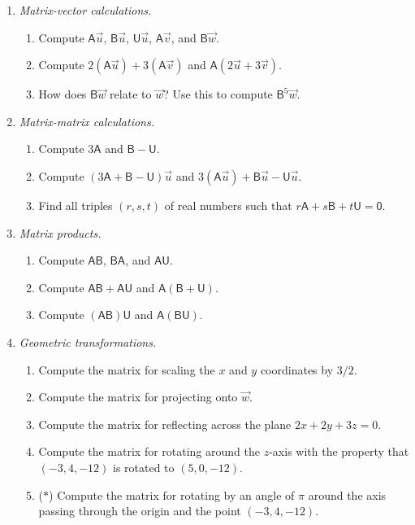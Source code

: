 \begin{enumerate}
\item \emph{Matrix-vector calculations.}
\begin{enumerate}
\item Compute $\mathsf{A}\vec{u}$, $\mathsf{B}\vec{u}$, $\mathsf{U}\vec{u}$, $\mathsf{A}\vec{v}$, and $\mathsf{B}\vec{w}$.
\item Compute $2(\mathsf{A}\vec{u}) + 3(\mathsf{A}\vec{v})$ and $\mathsf{A}(2\vec{u} + 3\vec{v})$.
\item How does $\mathsf{B}\vec{w}$ relate to $\vec{w}$? Use this to compute $\mathsf{B}^5\vec{w}$.
\end{enumerate}
\item \emph{Matrix-matrix calculations.}
\begin{enumerate}
\item Compute $3\mathsf{A}$ and $\mathsf{B} - \mathsf{U}$.
\item Compute $(3\mathsf{A} + \mathsf{B} - \mathsf{U})\vec{u}$ and $3(\mathsf{A}\vec{u}) + \mathsf{B}\vec{u} - \mathsf{U}\vec{u}$.
\item Find all triples $(r,s,t)$ of real numbers such that $r\mathsf{A} + s\mathsf{B} + t\mathsf{U} = \mathsf{0}$.
\end{enumerate}
\item \emph{Matrix products.}
\begin{enumerate}
\item Compute $\mathsf{AB}$, $\mathsf{BA}$, and $\mathsf{AU}$.
\item Compute $\mathsf{AB} + \mathsf{AU}$ and $\mathsf{A}(\mathsf{B} + \mathsf{U})$.
\item Compute $(\mathsf{AB})\mathsf{U}$ and $\mathsf{A}(\mathsf{BU})$.
\end{enumerate}
\item \emph{Geometric transformations.}
\begin{enumerate}
\item Compute the matrix for scaling the $x$ and $y$ coordinates by $3/2$.
\item Compute the matrix for projecting onto $\vec{w}$.
\item Compute the matrix for reflecting across the plane $2x + 2y + 3z = 0$.
\item Compute the matrix for rotating around the $z$-axis with the property that $(-3,4,-12)$ is rotated to $(5,0,-12)$.
\item ($*$) Compute the matrix for rotating by an angle of $\pi$ around the axis passing through the origin and the point $(-3,4,-12)$.

\end{enumerate}
\end{enumerate}
